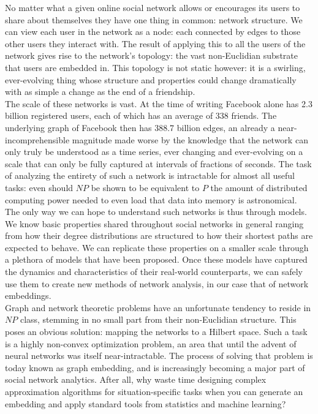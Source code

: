\documentclass[12pt,twoside]{report}
\begin{document}
No matter what a given online social network allows or encourages its users to share about themselves they have one thing in common: network structure. We can view each user in the network as a node: each connected by edges to those other users they interact with. The result of applying this to all the users of the network gives rise to the network's topology: the vast non-Euclidian substrate that users are embedded in. This topology is not static however: it is a swirling, ever-evolving thing whose structure and properties could change dramatically with as simple a change as the end of a friendship. \\

The scale of these networks is vast. At the time of writing Facebook alone has 2.3 billion registered users, each of which has an average of 338 friends. The underlying graph of Facebook then has 388.7 billion edges, an already a near-incomprehensible magnitude made worse by the knowledge that the network can only truly be understood as a time series, ever changing and ever-evolving on a scale that can only be fully captured at intervals of fractions of seconds. The task of analyzing the entirety of such a network is intractable for almost all useful tasks: even should $NP$ be shown to be equivalent to $P$ the amount of distributed computing power needed to even load that data into memory is astronomical. \\

The only way we can hope to understand such networks is thus through models. We know basic properties shared throughout social networks in general ranging from how their degree distributions are structured to how their shortest paths are expected to behave. We can replicate these properties on a smaller scale through a plethora of models that have been proposed. Once these models have captured the dynamics and characteristics of their real-world counterparts, we can safely use them to create new methods of network analysis, in our case that of network embeddings. \\

Graph and network theoretic problems have an unfortunate tendency to reside in $NP$ class, stemming in no small part from their non-Euclidian structure. This poses an obvious solution: mapping the networks to a Hilbert space. Such a task is a highly non-convex optimization problem, an area that until the advent of neural networks was itself near-intractable. The process of solving that problem is today known as graph embedding, and is increasingly becoming a major part of social network analytics. After all, why waste time designing complex approximation algorithms for situation-specific tasks when you can generate an embedding and apply standard tools from statistics and machine learning? \\
\end{document}
